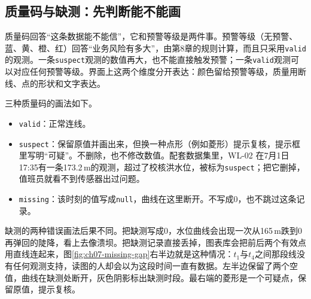 \subsection{质量码与缺测：先判断能不能画}

质量码回答“这条数据能不能信”，它和预警等级是两件事。预警等级（无预警、蓝、黄、橙、红）回答“业务风险有多大”，由第8章的规则计算，而且只采用\texttt{valid}的观测。一条\texttt{suspect}观测的数值再大，也不能直接触发预警；一条\texttt{valid}观测可以对应任何预警等级。界面上这两个维度分开表达：颜色留给预警等级，质量用断线、点的形状和文字表达。

三种质量码的画法如下。
\begin{itemize}
\item \texttt{valid}：正常连线。
\item \texttt{suspect}：保留原值并画出来，但换一种点形（例如菱形）提示复核，提示框里写明“可疑”。不删除，也不修改数值。配套数据集里，WL-02 在7月1日17:35有一条173.2\,m的观测，超过了校核洪水位，被标为\texttt{suspect}；把它删掉，值班员就看不到传感器出过问题。
\item \texttt{missing}：该时刻的值写成\texttt{null}，曲线在这里断开。不写成0，也不跳过这条记录。
\end{itemize}

缺测的两种错误画法后果不同。把缺测写成0，水位曲线会出现一次从165\,m跌到0再弹回的陡降，看上去像溃坝。把缺测记录直接丢掉，图表库会把前后两个有效点用直线连起来，图\ref{fig:ch07-missing-gap}右半边就是这种情况：$t_1$与$t_4$之间那段线没有任何观测支持，读图的人却会以为这段时间一直有数据。左半边保留了两个空值，曲线在缺测处断开，灰色阴影标出缺测时段。最右端的菱形是一个可疑点，保留原值，提示复核。

